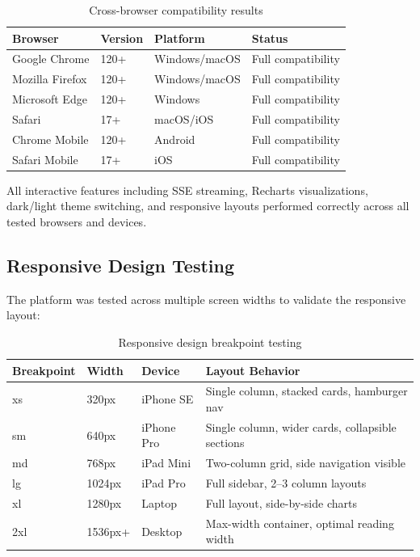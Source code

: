 \documentclass[12pt, a4paper, oneside]{report}
\begin{document}
\begin{table}[H]
\centering
\caption{Cross-browser compatibility results}
\label{tab:browser_testing}
\begin{tabular}{@{}l l l l@{}}
\toprule
\textbf{Browser} & \textbf{Version} & \textbf{Platform} & \textbf{Status} \\
\midrule
Google Chrome & 120+ & Windows/macOS & Full compatibility \\
Mozilla Firefox & 120+ & Windows/macOS & Full compatibility \\
Microsoft Edge & 120+ & Windows & Full compatibility \\
Safari & 17+ & macOS/iOS & Full compatibility \\
Chrome Mobile & 120+ & Android & Full compatibility \\
Safari Mobile & 17+ & iOS & Full compatibility \\
\bottomrule
\end{tabular}
\end{table}

All interactive features including SSE streaming, Recharts visualizations, dark/light theme switching, and responsive layouts performed correctly across all tested browsers and devices.

\subsection{Responsive Design Testing}

The platform was tested across multiple screen widths to validate the responsive layout:

\begin{table}[H]
\centering
\caption{Responsive design breakpoint testing}
\label{tab:responsive_testing}
\begin{tabularx}{\textwidth}{@{}l l l X@{}}
\toprule
\textbf{Breakpoint} & \textbf{Width} & \textbf{Device} & \textbf{Layout Behavior} \\
\midrule
xs & 320px & iPhone SE & Single column, stacked cards, hamburger nav \\
sm & 640px & iPhone Pro & Single column, wider cards, collapsible sections \\
md & 768px & iPad Mini & Two-column grid, side navigation visible \\
lg & 1024px & iPad Pro & Full sidebar, 2--3 column layouts \\
xl & 1280px & Laptop & Full layout, side-by-side charts \\
2xl & 1536px+ & Desktop & Max-width container, optimal reading width \\
\bottomrule
\end{tabularx}
\end{table}
\end{document}
